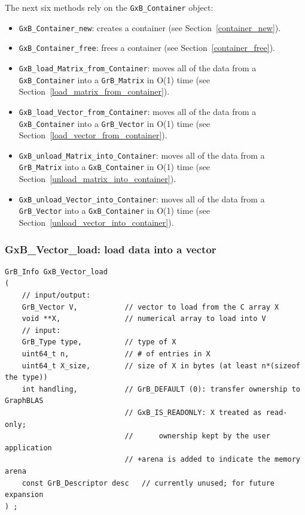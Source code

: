 The next six methods rely on the \verb'GxB_Container' object:

\begin{itemize}
\item \verb'GxB_Container_new': creates a container
    (see Section~\ref{container_new}).

\item \verb'GxB_Container_free': frees a container
    (see Section~\ref{container_free}).

\item \verb'GxB_load_Matrix_from_Container': moves all of the data from a
    \verb'GxB_Container' into a \verb'GrB_Matrix' in O(1) time
    (see Section~\ref{load_matrix_from_container}).

\item \verb'GxB_load_Vector_from_Container': moves all of the data from a
    \verb'GxB_Container' into a \verb'GrB_Vector' in O(1) time
    (see Section~\ref{load_vector_from_container}).

\item \verb'GxB_unload_Matrix_into_Container': moves all of the data from
    a \verb'GrB_Matrix' into a \verb'GxB_Container' in O(1) time
    (see Section~\ref{unload_matrix_into_container}).

\item \verb'GxB_unload_Vector_into_Container': moves all of the data from
    a \verb'GrB_Vector' into a \verb'GxB_Container' in O(1) time
    (see Section~\ref{unload_vector_into_container}).

\end{itemize}

\subsubsection{{\sf GxB\_Vector\_load:} load data into a vector}
\label{vector_load}

\begin{mdframed}[userdefinedwidth=6in]
{\footnotesize
\begin{verbatim}
GrB_Info GxB_Vector_load
(
    // input/output:
    GrB_Vector V,           // vector to load from the C array X
    void **X,               // numerical array to load into V
    // input:
    GrB_Type type,          // type of X
    uint64_t n,             // # of entries in X
    uint64_t X_size,        // size of X in bytes (at least n*(sizeof the type))
    int handling,           // GrB_DEFAULT (0): transfer ownership to GraphBLAS
                            // GxB_IS_READONLY: X treated as read-only;
                            //      ownership kept by the user application
                            // +arena is added to indicate the memory arena
    const GrB_Descriptor desc   // currently unused; for future expansion
) ;
\end{verbatim}
} \end{mdframed}

